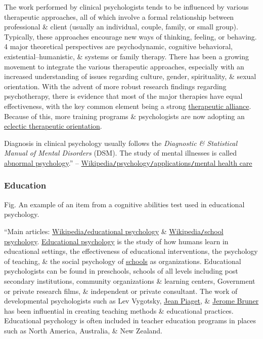 \documentclass[oneside]{book}
\numberwithin{equation}{section}
\begin{document}
The work performed by clinical psychologists tends to be influenced by various therapeutic approaches, all of which involve a formal relationship between professional \& client (usually an individual, couple, family, or small group). Typically, these approaches encourage new ways of thinking, feeling, or behaving. 4 major theoretical perspectives are psychodynamic, cognitive behavioral, existential--humanistic, \& systems or family therapy. There has been a growing movement to integrate the various therapeutic approaches, especially with an increased understanding of issues regarding culture, gender, spirituality, \& sexual orientation. With the advent of more robust research findings regarding psychotherapy, there is evidence that most of the major therapies have equal effectiveness, with the key common element being a strong \href{https://en.wikipedia.org/wiki/Therapeutic_relationship}{therapeutic alliance}. Because of this, more training programs \& psychologists are now adopting an \href{https://en.wikipedia.org/wiki/Integrative_Psychotherapy}{eclectic therapeutic orientation}.

Diagnosis in clinical psychology usually follows the \textit{Diagnostic \& Statistical Manual of Mental Disorders} (DSM). The study of mental illnesses is called \href{https://en.wikipedia.org/wiki/Abnormal_psychology}{abnormal psychology}.'' -- \href{https://en.wikipedia.org/wiki/Psychology#Mental_health_care}{Wikipedia\texttt{/}psychology\texttt{/}applications\texttt{/}mental health care}

\subsubsection{Education}
\textsf{Fig. An example of an item from a cognitive abilities test used in educational psychology.}

``Main articles: \href{https://en.wikipedia.org/wiki/Educational_psychology}{Wikipedia\texttt{/}educational psychology} \& \href{https://en.wikipedia.org/wiki/School_psychology}{Wikipedia\texttt{/}school psychology}. \href{https://en.wikipedia.org/wiki/Educational_psychology}{Educational psychology} is the study of how humans learn in educational settings, the effectiveness of educational interventions, the psychology of teaching, \& the social psychology of \href{https://en.wikipedia.org/wiki/School}{schools} as organizations. Educational psychologists can be found in preschools, schools of all levels including post secondary institutions, community organizations \& learning centers, Government or private research films, \& independent or private consultant. The work of developmental psychologists such as Lev Vygotsky, \href{https://en.wikipedia.org/wiki/Jean_Piaget}{Jean Piaget}, \& \href{https://en.wikipedia.org/wiki/Jerome_Bruner}{Jerome Bruner} has been influential in creating teaching methods \& educational practices. Educational psychology is often included in teacher education programs in places such as North America, Australia, \& New Zealand.
\end{document}
